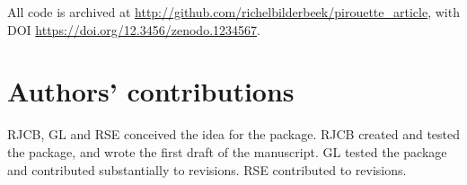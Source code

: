 All code is archived at 
\url{http://github.com/richelbilderbeek/pirouette_article},
with DOI \url{https://doi.org/12.3456/zenodo.1234567}.

\section{Authors' contributions}

RJCB, GL and RSE conceived the idea for the package. 
RJCB created and tested the package, and wrote the first draft of the 
manuscript.
GL tested the package and contributed substantially to revisions.
RSE contributed to revisions.



